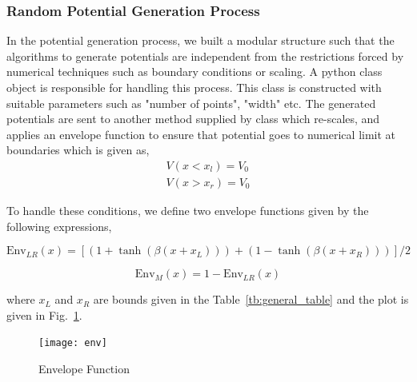 \documentclass[a4paper,times,hidelinks,12pt]{article}
\begin{document}
\subsubsection{Random Potential Generation Process} \label{sec:potential_generation}

In the potential generation process, we built a modular structure such that the algorithms to generate potentials are independent from the restrictions forced by numerical techniques such as boundary conditions or scaling. A python class object is responsible for handling this process. This class is constructed with suitable parameters such as "number of points", "width" etc. The generated potentials are sent to another method supplied by class which re-scales, and applies an envelope function to ensure that potential goes to numerical limit at boundaries which is given as,
\begin{equation}
\label{eq:potential_boundary_conditions}
\begin{split}
    V(x < x_l) = V_0 \\ 
    V(x > x_r) = V_0
\end{split}
\end{equation}

To handle these conditions, we define two envelope functions given by the following expressions, 

\begin{equation}
\label{eq:envelope_potential_lr}
    \text{Env}_{LR}(x) = [(1 + \tanh{(\beta(x + x_L))}) + (1 - \tanh{(\beta(x + x_R))})]/2
\end{equation}

\begin{equation}
\label{eq:envelope_potential_m}
    \text{Env}_{M}(x) = 1 - \text{Env}_{LR}(x)
\end{equation}

\noindent where $x_L$ and $x_R$ are bounds given in the Table~\eqref{tb:general_table} and the plot is given in Fig.~\ref{fig:envelope_and_random_withot_pros}.  

\graphicspath{{"../figs/potentials/"}}
\begin{figure}[H]
\centering
\texttt{[image: env]}
\caption{Envelope Function}
\label{fig:envelope_and_random_withot_pros}
\end{figure}
\end{document}
